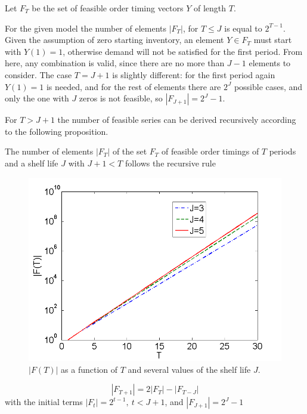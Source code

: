 \begin{defn}
Let $F_T$ be the set of feasible order timing vectors $Y$ of length $T$.
\end{defn}

For the given model the number of elements $|F_T|$, for $T\leq J$ is equal to $2^{T-1}$. Given the assumption of zero starting inventory, an element $Y\in F_T$ must start with $Y(1)=1$, otherwise demand will not be satisfied for the first period. From here, any combination is valid, since there are no more than $J-1$ elements to consider. The case $T=J+1$ is slightly different: for the first period again $Y(1)=1$ is needed, and for the rest of elements there are $2^J$ possible cases, and only the one with $J$ zeros is not feasible, so $|F_{J+1}|=2^J-1$.

For $T>J+1$ the number of feasible series can be derived recursively according to the following proposition.
\begin{proposition}
\label{prop:numberfeasible}
The number of elements $|F_T|$ of the set $F_T$ of feasible order timings of $T$ periods and a shelf life $J$ with $J+1<T$ follows the recursive rule
\begin{figure}[h]
\centering
\includegraphics[scale=0.4]{iccsa2015/figures/numberfeasiblelogy.png} %
\caption{ $|F(T)|$ as a function of $T$ and several values of the shelf life $J$.}
\label{fig:numberfeasible}
\end{figure}

\begin{equation}
\label{eq:numberfeasibleY(T)}
|F_{T+1}|= 2|F_{T}| -|F_{T-J}|
\end{equation}
with the initial terms  $|F_{t}|=2^{t-1}, \  t<J+1$, and  $|F_{J+1}|=2^J-1 $
\end{proposition}

